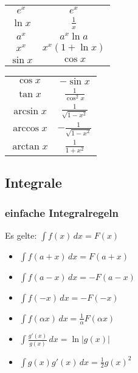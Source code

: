 \begin{multicols}{2}
\begin{multicols}{3}
\begin{tabular}{|c|c|} \hline
$e^x$ & $e^x$ \\
$\ln x$ & $\frac{1}{x}$ \\
$a^x$ & $a^x \ln a$ \\
$x^x$ & $x^x (1 + \ln x)$ \\
$\sin x$ & $\cos x$ \\
\hline
\end{tabular}

\begin{tabular}{|c|c|} \hline
$\cos x$ & $-\sin x$ \\
$\tan x$ & $\frac{1}{\cos^2 x}$ \\
$\arcsin x$ & $\frac{1}{\sqrt{1-x^2}}$ \\
$\arccos x$ & $-\frac{1}{\sqrt{1-x^2}}$ \\
$\arctan x$ & $\frac{1}{1 + x^2}$ \\
\hline
\end{tabular}
\end{multicols}

\subsection{Integrale}
\subsubsection{einfache Integralregeln}
Es gelte: $\int f(x) \, dx = F(x)$
\begin{itemize}[leftmargin=*]
	\item $\int f(a + x) \,dx = F(a + x)$
	\item $\int f(a - x) \,dx = -F(a-x)$
	\item $\int f(-x) \,dx = -F(-x)$
	\item $\int f(\alpha x) \,dx = \frac{1}{\alpha}F(\alpha x)$
	\item $\int \frac{g'(x)}{g(x)} \, dx = \ln|g(x)|$
	\item $\int g(x)g'(x) \, dx = \frac{1}{2}g(x)^2$
\end{itemize}

\end{multicols}
